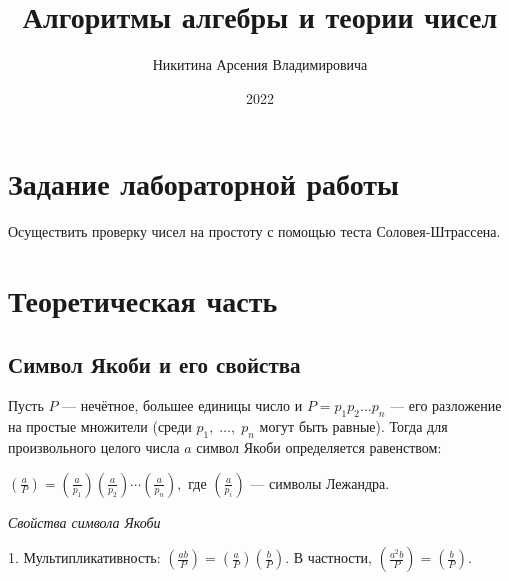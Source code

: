\documentclass[bachelor, och, labwork]{shiza}
\begin{document}
\title{Алгоритмы алгебры и теории чисел}





\author{Никитина Арсения Владимировича}




\date{2022}

\maketitle



\tableofcontents

\section{Задание лабораторной работы}

Осуществить проверку чисел на простоту с помощью теста Соловея-Штрассена.


\section{Теоретическая часть}

\subsection{Символ Якоби и его свойства}

Пусть $P$ --- нечётное, большее единицы число и $P=p_{1}p_{2}\ldots p_{n}$ ---
его разложение на простые множители (среди $p_{1},\;\ldots ,\;p_{n}$ могут быть равные).
Тогда для произвольного целого числа $a$ символ Якоби определяется равенством:

$\left({\frac {a}{P}}\right)=\left({\frac {a}{p_{1}}}\right)\left({\frac {a}{p_{2}}}\right)\cdots \left({\frac {a}{p_{n}}}\right),$
где $\left(\frac{a}{p_i}\right)$ --- символы Лежандра.

\begin{center}
    \textit{Свойства символа Якоби}
\end{center}

1. Мультипликативность: $\left({\frac {ab}{P}}\right)=\left({\frac {a}{P}}\right)\left({\frac {b}{P}}\right)$.
В частности, $\left({\frac {a^{2}b}{P}}\right)=\left({\frac {b}{P}}\right)$.
\end{document}
